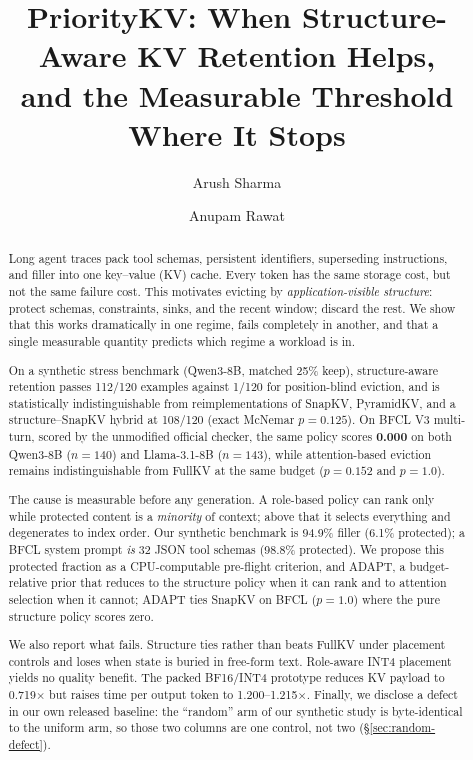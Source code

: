 \documentclass[10pt]{article}
\title{PriorityKV: When Structure-Aware KV Retention Helps,\\and the Measurable Threshold Where It Stops}
\author[1]{Arush Sharma}
\author[2]{Anupam Rawat}
\affil[1]{Indian Institute of Technology (Indian School of Mines) Dhanbad}
\affil[2]{Indian Institute of Technology Bombay}
\date{}
\begin{document}
\maketitle

\begin{abstract}
Long agent traces pack tool schemas, persistent identifiers, superseding
instructions, and filler into one key--value (KV) cache.  Every token has the
same storage cost, but not the same failure cost.  This motivates evicting by
\emph{application-visible structure}: protect schemas, constraints, sinks, and
the recent window; discard the rest.  We show that this works dramatically in one
regime, fails completely in another, and that a single measurable quantity
predicts which regime a workload is in.

On a synthetic stress benchmark (Qwen3-8B, matched 25\% keep), structure-aware
retention passes 112/120 examples against 1/120 for position-blind eviction, and
is statistically indistinguishable from reimplementations of SnapKV, PyramidKV,
and a structure--SnapKV hybrid at 108/120 (exact McNemar $p=0.125$).  On BFCL V3
multi-turn, scored by the unmodified official checker, the same policy scores
\textbf{0.000} on both Qwen3-8B ($n{=}140$) and Llama-3.1-8B ($n{=}143$), while
attention-based eviction remains indistinguishable from FullKV at the same
budget ($p=0.152$ and $p=1.0$).

The cause is measurable before any generation.  A role-based policy can rank only
while protected content is a \emph{minority} of context; above that it selects
everything and degenerates to index order.  Our synthetic benchmark is 94.9\%
filler (6.1\% protected); a BFCL system prompt \emph{is} 32 JSON tool schemas
(98.8\% protected).  We propose this protected fraction as a CPU-computable
pre-flight criterion, and ADAPT, a budget-relative prior that reduces to the
structure policy when it can rank and to attention selection when it cannot;
ADAPT ties SnapKV on BFCL ($p=1.0$) where the pure structure policy scores zero.

We also report what fails.  Structure ties rather than beats FullKV under
placement controls and loses when state is buried in free-form text.  Role-aware
INT4 placement yields no quality benefit.  The packed BF16/INT4 prototype reduces
KV payload to 0.719$\times$ but raises time per output token to
1.200--1.215$\times$.  Finally, we disclose a defect in our own released
baseline: the ``random'' arm of our synthetic study is byte-identical to the
uniform arm, so those two columns are one control, not two
(\S\ref{sec:random-defect}).
\end{abstract}
\end{document}
